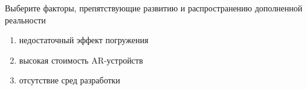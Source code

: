 
Выберите факторы, препятствующие развитию и распространению дополненной реальности

\begin{enumerate}
    \item недостаточный эффект погружения
    \item высокая стоимость AR-устройств
    \item отсутствие сред разработки
\end{enumerate}